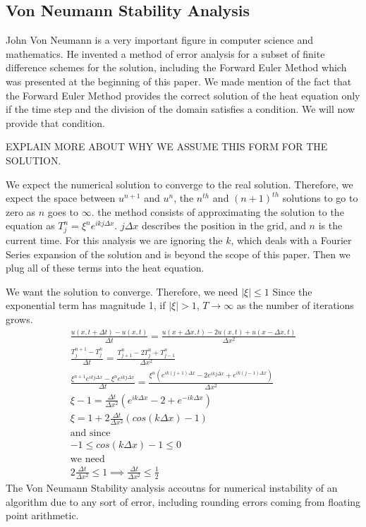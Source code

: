 \documentclass[a4paper]{article}
\begin{document}
\subsection{Von Neumann Stability Analysis}
John Von Neumann is a very important figure in computer science and mathematics. He invented a method of error analysis for a subset of finite difference schemes for the solution, including the Forward Euler Method which was presented at the beginning of this paper. We made mention of the fact that the Forward Euler Method provides the correct solution of the heat equation only if the time step and the division of the domain satisfies a condition. We will now provide that condition.

EXPLAIN MORE ABOUT WHY WE ASSUME THIS FORM FOR THE SOLUTION.

We expect the numerical solution to converge to the real solution. Therefore, we expect the space between $u^{n+1}$ and $u^n$, the $n^{th}$ and $(n+1)^{th}$ solutions to go to zero as $n$ goes to $\infty$. the method consists of approximating the solution to the equation as $T^n_j = \xi^ne^{ikj\Delta x}$. $j\Delta x$ describes the position in the grid, and $n$ is the current time. For this analysis we are ignoring the $k$, which deals with a Fourier Series expansion of the solution and is beyond the scope of this paper. Then we plug all of these terms into the heat equation.

We want the solution to converge. Therefore, we need $|\xi|\le 1$ Since the exponential term has magnitude 1, if $|\xi|>1$, $T\to\infty$ as the number of iterations grows.
\begin{gather}
\frac{u(x, t + \Delta t) - u(x, t)}{\Delta t} = \frac{u(x + \Delta x, t) - 2u(x, t) + u(x - \Delta x, t)}{\Delta x^2}\\
\frac{T^{n+1}_j - T^n_j}{\Delta t} = \frac{T^n_{j+1} - 2T_j^n + T_{j-1}^n}{\Delta x^2}\\
\frac{\xi^{n+1}e^{ikj\Delta x} - \xi^ne^{ikj\Delta x}}{\Delta t} = \frac{\xi^n(e^{ik(j+1)\Delta x} - 2e^{ikj\Delta x} + e^{ik(j-1)\Delta x})}{\Delta x^2}\\
\xi - 1 = \frac{\Delta t}{\Delta x^2}(e^{ik\Delta x} - 2 + e^{-ik\Delta x})\\
\xi = 1 + 2\frac{\Delta t}{\Delta x^2}(cos(k\Delta x) - 1)\\
\textrm{and since}\\
-1\le cos(k\Delta x) - 1 \le 0\\
\textrm{we need}\\
2\frac{\Delta t}{\Delta x^2} \le 1 \implies \frac{\Delta t}{\Delta x ^ 2} \le \frac12
\end{gather} 
The Von Neumann Stability analysis accoutns for numerical instability of an algorithm due to any sort of error, including rounding errors coming from floating point arithmetic.
\end{document}
